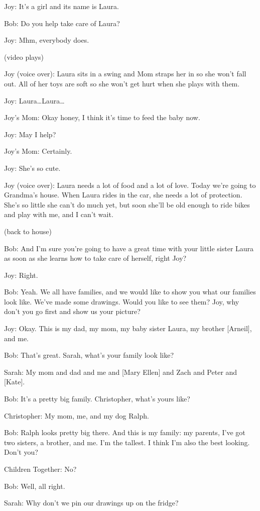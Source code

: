 Joy: It's a girl and its name is Laura.

Bob: Do you help take care of Laura?

Joy: Mhm, everybody does.

(video plays)

Joy (voice over): Laura sits in a swing and Mom straps her in so she won't fall out. All of her toys are soft so she won't get hurt when she plays with them.

Joy: Laura\dots Laura\dots

Joy's Mom: Okay honey, I think it's time to feed the baby now.

Joy: May I help?

Joy's Mom: Certainly.

Joy: She's so cute.

Joy (voice over): Laura needs a lot of food and a lot of love. Today we're going to Grandma's house. When Laura rides in the car, she needs a lot of protection. She's so little she can't do much yet, but soon she'll be old enough to ride bikes and play with me, and I can't wait.

(back to house)

Bob: And I'm sure you're going to have a great time with your little sister Laura as soon as she learns how to take care of herself, right Joy?

Joy: Right.

Bob: Yeah. We all have families, and we would like to show you what our families look like. We've made some drawings. Would you like to see them? Joy, why don't you go first and show us your picture?

Joy: Okay. This is my dad, my mom, my baby sister Laura, my brother [Arneil], and me.

Bob: That's great. Sarah, what's your family look like?

Sarah: My mom and dad and me and [Mary Ellen] and Zach and Peter and [Kate].

Bob: It's a pretty big family. Christopher, what's yours like?

Christopher: My mom, me, and my dog Ralph.

Bob: Ralph looks pretty big there. And this is my family: my parents, I've got two sisters, a brother, and me. I'm the tallest. I think I'm also the best looking. Don't you?

Children Together: No?

Bob: Well, all right.

Sarah: Why don't we pin our drawings up on the fridge?

